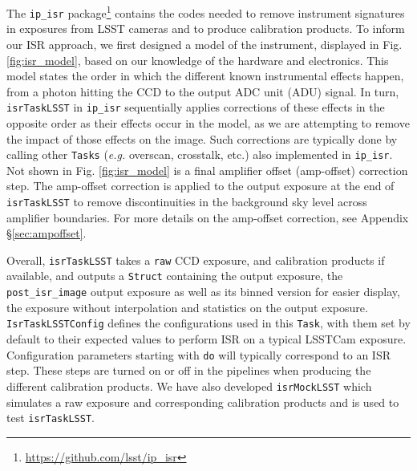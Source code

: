 The \texttt{ip\_isr} package\footnote{\url{https://github.com/lsst/ip_isr}} contains the codes needed to remove instrument signatures in exposures from LSST cameras and to produce calibration products.
To inform our ISR approach, we first designed a model of the instrument, displayed in Fig. \ref{fig:isr_model}, based on our knowledge of the hardware and electronics.
This model states the order in which the different known instrumental effects happen, from a photon hitting the CCD to the output ADC unit (ADU) signal.
In turn, \texttt{isrTaskLSST} in \texttt{ip\_isr} sequentially applies corrections of these effects in the opposite order as their effects occur in the model, as we are attempting to remove the impact of those effects on the image.
Such corrections are typically done by calling other \texttt{Tasks} (\textit{e.g.} overscan, crosstalk, etc.) also implemented in \texttt{ip\_isr}.
Not shown in Fig. \ref{fig:isr_model} is a final amplifier offset (amp-offset) correction step.
The amp-offset correction is applied to the output exposure at the end of \texttt{isrTaskLSST} to remove discontinuities in the background sky level across amplifier boundaries.
For more details on the amp-offset correction, see Appendix \S\ref{sec:ampoffset}.

Overall, \texttt{isrTaskLSST} takes a \texttt{raw} CCD exposure, and calibration products if available, and outputs a \texttt{Struct} containing the output exposure, the \texttt{post\_isr\_image} output exposure as well as its binned version for easier display, the exposure without interpolation and statistics on the output exposure.
\texttt{IsrTaskLSSTConfig} defines the configurations used in this \texttt{Task}, with them set by default to their expected values to perform ISR on a typical LSSTCam exposure.
Configuration parameters starting with \texttt{do} will typically correspond to an ISR step.
These steps are turned on or off in the pipelines when producing the different calibration products.
We have also developed \texttt{isrMockLSST} which simulates a raw exposure and corresponding calibration products and is used to test \texttt{isrTaskLSST}.
